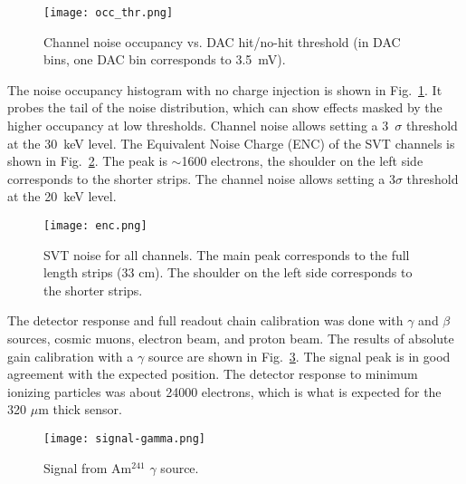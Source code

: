 \begin{figure}[hbt] 
\centering 
\texttt{[image: occ\_thr.png]}
\caption{Channel noise occupancy vs. DAC hit/no-hit threshold (in DAC bins, one DAC bin corresponds to 3.5~mV).}
\label{fig:noiseocc}
\end{figure}

The noise occupancy histogram with no charge injection is shown in Fig.~\ref{fig:noiseocc}. It probes the tail of the noise distribution, which can show effects masked by the higher occupancy at low thresholds. Channel noise allows setting a 3~$\sigma$ threshold at the 30~keV level. The Equivalent Noise Charge (ENC) of the SVT channels is shown in  Fig.~\ref{fig:enc}. The peak is $\sim$1600 electrons, the shoulder on the left side corresponds to the shorter strips. The channel noise allows setting a 3$\sigma$ threshold at the 20~keV level. 

\begin{figure}[hbt] 
	\centering 
	\texttt{[image: enc.png]}
	\caption{SVT noise for all channels. The main peak corresponds to the full length strips (33 cm). The shoulder on the left side corresponds to the shorter strips.}
	\label{fig:enc}
\end{figure}

The detector response and full readout chain calibration was done with $\gamma$ and $\beta$ sources, cosmic muons, electron beam, and proton beam. The results of absolute gain calibration with a $\gamma$ source are shown in Fig.~\ref{fig:signal-gamma}. The signal peak is in good agreement with the expected position. The detector response to minimum ionizing particles was about 24000 electrons, which is what is expected for the 320 $\mu$m thick sensor.

\begin{figure}[hbt] 
	\centering 
	\texttt{[image: signal-gamma.png]}
	\caption{Signal from Am$^{241}$ $\gamma$ source.}
	\label{fig:signal-gamma}
\end{figure}

%
%

